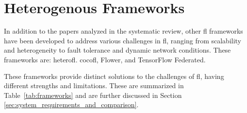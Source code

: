 \section{Heterogenous Frameworks}
\label{sec:other-frameworks}

In addition to the papers analyzed in the systematic review, other \ac{fl} frameworks have been developed to address various challenges in \ac{fl}, ranging from scalability and heterogeneity to fault tolerance and dynamic network conditions. These frameworks are: \ac{heterofl}. \ac{cocofl}, Flower, and TensorFlow Federated.

These frameworks provide distinct solutions to the challenges of \ac{fl}, having different strengths and limitations. These are summarized in Table~\ref{tab:frameworks} and are further discussed in Section \ref{sec:system_requirements_and_comparison}.

